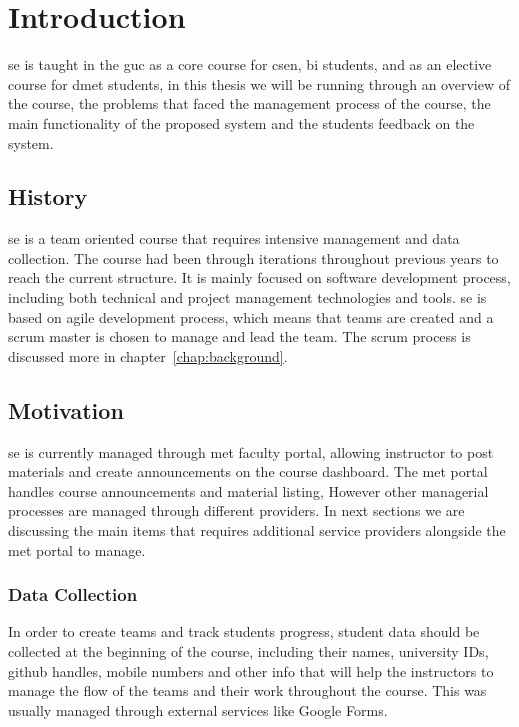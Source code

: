 \chapter{Introduction}
\label{chap:intro}

\ac{se} is taught in the \ac{guc} as a core course for \ac{csen}, \ac{bi} students, and as an elective course for \ac{dmet} students, in this thesis
we will be running through an overview of the course, the problems that faced the management process of the course, the main
functionality of the proposed system and the students feedback on the system.

\section{History}
\label{sec:history}
\ac{se} is a team oriented course that requires intensive management and data collection. The course had been through iterations throughout previous years
to reach the current structure. It is mainly focused on software development process, including both technical and project management
technologies and tools. \ac{se} is based on agile development process, which means that teams are created and a scrum master is chosen to manage
and lead the team. The scrum process is discussed more in chapter~\ref{chap:background}.

\section{Motivation}
\label{sec:motivation}

\ac{se} is currently managed through \ac{met} faculty portal, allowing instructor to post materials and
create announcements on the course dashboard. The \ac{met} portal handles course announcements and material listing, However other
managerial processes are managed through different providers. In next sections we are discussing the main items that requires
additional service providers alongside the \ac{met} portal to manage.


\subsection{Data Collection}
\label{sub:data-collection}

In order to create teams and track students progress, student data should be collected
at the beginning of the course, including their names, university IDs, github handles, mobile numbers and other info that will
help the instructors to manage the flow of the teams and their work throughout the course. This was usually managed through external services
like Google Forms.

